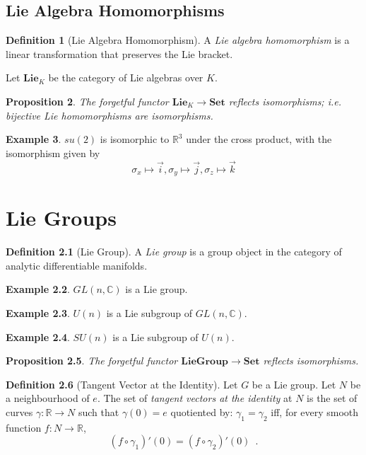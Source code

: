 \documentclass{book}
\newtheorem{prop}{Proposition}[chapter]
\theoremstyle{definition}
\newtheorem{df}[prop]{Definition}
\newtheorem{ex}[prop]{Example}
\newcommand{\Set}{\ensuremath{\mathbf{Set}}}
\begin{document}
\section{Lie Algebra Homomorphisms}

\begin{df}[Lie Algebra Homomorphism]
A \emph{Lie algebra homomorphism} is a linear transformation that preserves the Lie bracket.

Let $\mathbf{Lie}_K$ be the category of Lie algebras over $K$.
\end{df}

\begin{prop}
The forgetful functor $\mathbf{Lie}_K \rightarrow \Set$ reflects isomorphisms; i.e. bijective Lie homomorphisms are isomorphisms.
\end{prop}


\begin{ex}
$su(2)$ is isomorphic to $\mathbb{R}^3$ under the cross product, with the isomorphism given by
\[ \sigma_x \mapsto \vec{i}, \sigma_y \mapsto \vec{j}, \sigma_z \mapsto \vec{k} \]
\end{ex}

\chapter{Lie Groups}

\begin{df}[Lie Group]
A \emph{Lie group} is a group object in the category of analytic differentiable manifolds.
\end{df}

\begin{ex}
$GL(n,\mathbb{C})$ is a Lie group.
\end{ex}

\begin{ex}
$U(n)$ is a Lie subgroup of $GL(n,\mathbb{C})$.
\end{ex}

\begin{ex}
$SU(n)$ is a Lie subgroup of $U(n)$.
\end{ex}

\begin{prop}
The forgetful functor $\mathbf{LieGroup} \rightarrow \Set$ reflects isomorphisms.
\end{prop}


\begin{df}[Tangent Vector at the Identity]
Let $G$ be a Lie group. Let $N$ be a neighbourhood of $e$. The set of \emph{tangent vectors at the identity} at $N$ is the set of curves $\gamma : \mathbb{R} \rightarrow N$ such that $\gamma(0) = e$ quotiented by: $\gamma_1 = \gamma_2$ iff, for every smooth function $f : N \rightarrow \mathbb{R}$,
\[ (f \circ \gamma_1)'(0) = (f \circ \gamma_2)'(0) \enspace . \]
\end{df}
\end{document}
